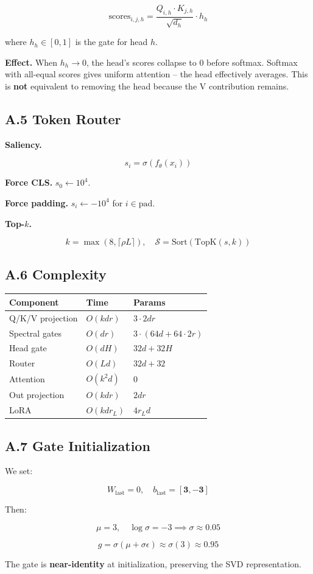 \[
\text{scores}_{i, j, h} = \frac{Q_{i, h} \cdot K_{j, h}}{\sqrt{d_h}} \cdot h_h
\tag{A.8}
\]

where $h_h \in [0, 1]$ is the gate for head $h$.

\textbf{Effect.} When $h_h \to 0$, the head's scores collapse to 0 before softmax. 
Softmax with all-equal scores gives uniform attention -- the head 
effectively averages. This is \textbf{not} equivalent to removing the head 
because the V contribution remains.

\subsection{A.5 Token Router}

\textbf{Saliency.}

\[
s_i = \sigma(f_\theta(x_i))
\tag{A.9}
\]

\textbf{Force CLS.} $s_0 \leftarrow 10^4$.

\textbf{Force padding.} $s_i \leftarrow -10^4$ for $i \in \text{pad}$.

\textbf{Top-$k$.}

\[
k = \max(8, \lceil \rho L \rceil), \quad
\mathcal{S} = \text{Sort}(\text{TopK}(s, k))
\tag{A.10}
\]

\subsection{A.6 Complexity}

\begin{table}[H]
\centering
\small
\begin{tabular}{lll}
\toprule
\textbf{Component} & \textbf{Time} & \textbf{Params} \\
\midrule
Q/K/V projection & $O(k d r)$ & $3 \cdot 2 d r$ \\
Spectral gates & $O(d r)$ & $3 \cdot (64d + 64 \cdot 2r)$ \\
Head gate & $O(d H)$ & $32d + 32H$ \\
Router & $O(L d)$ & $32d + 32$ \\
Attention & $O(k^2 d)$ & 0 \\
Out projection & $O(k d r)$ & $2 d r$ \\
LoRA & $O(k d r_L)$ & $4 r_L d$ \\
\bottomrule
\end{tabular}
\end{table}

\subsection{A.7 Gate Initialization}

We set:

\[
W_\text{last} = 0, \quad b_\text{last} = [\mathbf{3}, \mathbf{-3}]
\tag{A.11}
\]

Then:

\[
\mu = 3, \quad \log \sigma = -3 \implies \sigma \approx 0.05
\tag{A.12}
\]

\[
g = \sigma(\mu + \sigma \epsilon) \approx \sigma(3) \approx 0.95
\tag{A.13}
\]

The gate is \textbf{near-identity} at initialization, preserving the SVD 
representation.

